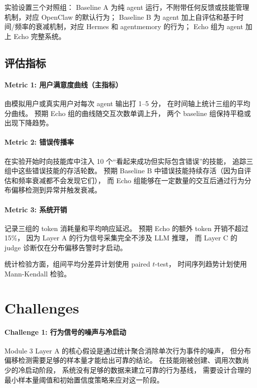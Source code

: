 \documentclass[12pt,a4paper]{article}
\begin{document}
	实验设置三个对照组：
	Baseline A 为纯 agent 运行，不附带任何反馈或技能管理机制，对应 OpenClaw 的默认行为；
	Baseline B 为 agent 加上自评估和基于时间/频率的衰减机制，对应 Hermes 和 agentmemory 的行为；
	Echo 组为 agent 加上 Echo 完整系统。
	
	\subsection{评估指标}
	
	\paragraph{Metric 1: 用户满意度曲线（主指标）}
	由模拟用户或真实用户对每次 agent 输出打 1--5 分，
	在时间轴上统计三组的平均分曲线。
	预期 Echo 组的曲线随交互次数单调上升，
	两个 baseline 组保持平稳或出现下降趋势。
	
	\paragraph{Metric 2: 错误传播率}
	在实验开始时向技能库中注入 10 个``看起来成功但实际包含错误''的技能，
	追踪三组中这些错误技能的存活轮数。
	预期 Baseline B 中错误技能持续存活（因为自评估和频率衰减都不会发现它们），
	而 Echo 组能够在一定数量的交互后通过行为分布偏移检测到异常并触发衰减。
	
	\paragraph{Metric 3: 系统开销}
	记录三组的 token 消耗量和平均响应延迟。
	预期 Echo 的额外 token 开销不超过 15\%，
	因为 Layer A 的行为信号采集完全不涉及 LLM 推理，
	而 Layer C 的 judge 诊断仅在分布偏移告警时才启动。
	
	统计检验方面，组间平均分差异计划使用 paired $t$-test，
	时间序列趋势计划使用 Mann-Kendall 检验。
	
	
	\section{Challenges}
	
	\paragraph{Challenge 1: 行为信号的噪声与冷启动}
	Module 3 Layer A 的核心假设是通过统计聚合消除单次行为事件的噪声，
	但分布偏移检测需要足够的样本量才能给出可靠的结论。
	在技能刚被创建、调用次数尚少的冷启动阶段，
	系统没有足够的数据来建立可靠的行为基线，
	需要设计合理的最小样本量阈值和初始置信度策略来应对这一阶段。
	
\end{document}
